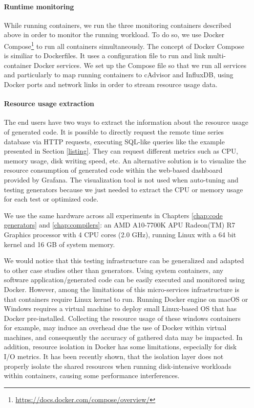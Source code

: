 \paragraph{Runtime monitoring}
While running containers, we run the three monitoring containers described above in order to monitor the running workload. To do so, we use Docker Compose\footnote{\url{https://docs.docker.com/compose/overview/}} to run all containers simultaneously. The concept of Docker Compose is similiar to Dockerfiles. It uses a configuration file to run and link multi-container Docker services. We set up the Compose file so that we run all services and particularly to map running containers to cAdvisor and InfluxDB, using Docker ports and network links in order to stream resource usage data.

\paragraph{Resource usage extraction}
The end users have two ways to extract the information about the resource usage of generated code. It is possible to directly request the remote time series database via HTTP requests, executing SQL-like queries like the example presented in Section \ref{listing}. They can request different metrics such as CPU, memory usage, disk writing speed, etc. An alternative solution is to visualize the resource consumption of generated code within the web-based dashboard provided by Grafana. The visualization tool is not used when auto-tuning and testing generators because we just needed to extract the CPU or memory usage for each test or optimized code. 

We use the same hardware across all experiments in Chapters \ref{chap:code generators} and \ref{chap:compilers}: an AMD A10-7700K APU Radeon(TM) R7 Graphics processor with 4 CPU cores (2.0 GHz), running Linux with a 64 bit kernel and 16 GB of system memory. 


\begin{remark}
	We would notice that this testing infrastructure can be generalized and adapted to other case studies other than generators. Using system containers, any software application/generated code can be easily executed and monitored using Docker. However, among the limitations of this micro-services infrastructure is that containers require Linux kernel to run. Running Docker engine on macOS or Windows requires a virtual machine to deploy small Linux-based OS that has Docker pre-installed. Collecting the resource usage of these windows containers for example, may induce an overhead due the use of Docker within virtual machines, and consequently the accuracy of gathered data may be impacted. In addition, resource isolation in Docker has some limitations, especially for disk I/O metrics. It has been recently shown\cite{xavier2015performance}, that the	isolation layer does not properly isolate the shared resources when running disk-intensive workloads within containers, causing some performance interferences. 
	
\end{remark}

